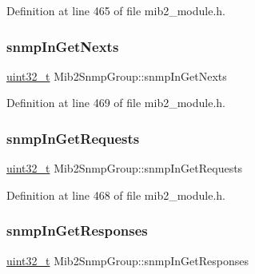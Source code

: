 Definition at line 465 of file mib2\+\_\+module.\+h.

\mbox{\label{structMib2SnmpGroup_a7a74af102357c8769419fe2b043e0349}} 
\subsubsection{\texorpdfstring{snmp\+In\+Get\+Nexts}{snmpInGetNexts}}
{\footnotesize\ttfamily \hyperlink{stdint_8h_a435d1572bf3f880d55459d9805097f62}{uint32\+\_\+t} Mib2\+Snmp\+Group\+::snmp\+In\+Get\+Nexts}



Definition at line 469 of file mib2\+\_\+module.\+h.

\mbox{\label{structMib2SnmpGroup_a7301c1b2df4cc37a347aef8863be0704}} 
\subsubsection{\texorpdfstring{snmp\+In\+Get\+Requests}{snmpInGetRequests}}
{\footnotesize\ttfamily \hyperlink{stdint_8h_a435d1572bf3f880d55459d9805097f62}{uint32\+\_\+t} Mib2\+Snmp\+Group\+::snmp\+In\+Get\+Requests}



Definition at line 468 of file mib2\+\_\+module.\+h.

\mbox{\label{structMib2SnmpGroup_aaca09e13e812344afcd4eee960849028}} 
\subsubsection{\texorpdfstring{snmp\+In\+Get\+Responses}{snmpInGetResponses}}
{\footnotesize\ttfamily \hyperlink{stdint_8h_a435d1572bf3f880d55459d9805097f62}{uint32\+\_\+t} Mib2\+Snmp\+Group\+::snmp\+In\+Get\+Responses}



